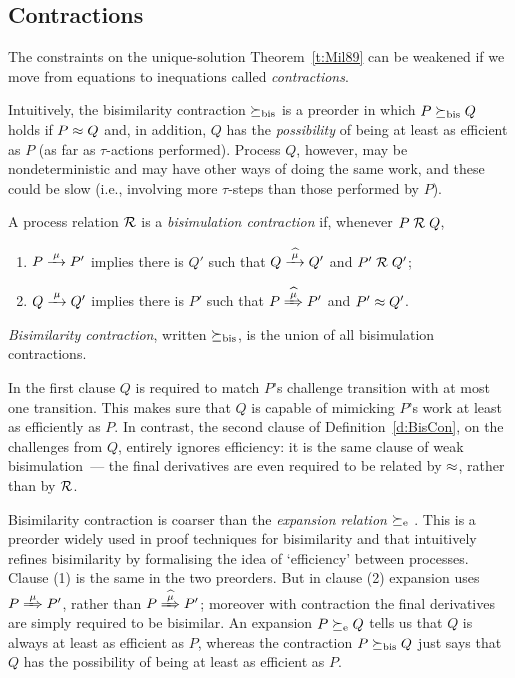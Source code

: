 \subsection{Contractions}
\label{s:mcontr}

The constraints on the unique-solution Theorem~\ref{t:Mil89} can be 
weakened if  we move from equations to inequations called
  \emph{contractions}.


  Intuitively,
  the bisimilarity contraction 
$\mathrel{\succeq_{\rm{bis}}}$ 
 is  a preorder in which 
$P \mathrel{\succeq_{\rm{bis}}} Q  $  holds  if $P \approx Q$ and, in addition, 
$Q$ has the \emph{possibility} of being at least as efficient as $P$ (as far as
$\tau$-actions performed). 
Process $Q$, however, may be nondeterministic and may have other ways
of doing the same work, and these could be  slow (i.e., involving
more $\tau$-steps than those performed by $P$).


\begin{definition}
\label{d:BisCon}
A process relation ${{\cal R}}$ 
 is a {\em  bisimulation  contraction}  if, whenever
 $P\mathrel{\cal R} Q$, %


\begin{enumerate}

\item   $P \arr\mu P'$ implies there is $Q'$ such that $Q \arcap \mu
  Q'$
 and $P' \mathrel{\cal R} Q'$;

\item 
    $Q \arr\mu Q'$   implies there is $P'$ such that $P \Arcap \mu
 P'$ and $P' 
\approx Q'$.
\end{enumerate}
\emph{Bisimilarity  contraction}, written $\mathrel{\succeq_{\rm{bis}}}$, is the union
of all bisimulation contractions. 
\end{definition}

In the first clause $Q$ is required to match $P$'s challenge
transition with at most one transition.
This makes sure that $Q$ is capable of mimicking $P$'s
work at least as efficiently as $P$. 
In contrast, the second clause of Definition~\ref{d:BisCon}, on the
challenges from $Q$, entirely ignores efficiency: it is the same
clause of  weak bisimulation~--- the final derivatives are even required
to be related  by $\approx$, rather than by ${\cal R}$.
 

Bisimilarity  contraction is coarser than 
 the \emph{expansion relation} 
$\mathrel{\succeq_{\rm{e}}}$ \cite{sangiorgi2015equations,arun1992efficiency}.
This is a
preorder widely used in proof techniques for bisimilarity and that 
intuitively refines bisimilarity by 
 formalising the idea of `efficiency' between processes.
Clause (1) is the same in the two
preorders. But in clause (2) expansion uses 
$P \Arr \mu P'$, rather than $P \Arcap \mu P'$; 
 moreover with
contraction the final derivatives are simply required to be bisimilar.
An expansion 
$P \mathrel{\succeq_{\rm{e}}} Q$
tells us  that $Q$ is always at least as efficient as $P$, whereas  the
 contraction $P \mathrel{\succeq_{\rm{bis}}} Q$  just says that $Q$ has the  possibility of
being at least as efficient as $P$. 

